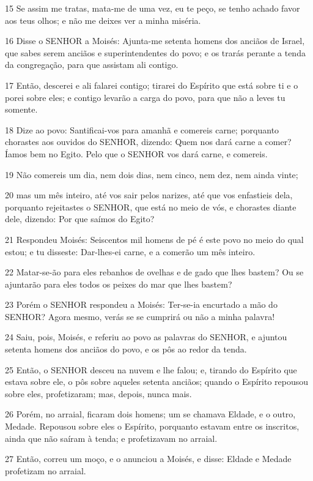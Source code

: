 \par 15 Se assim me tratas, mata-me de uma vez, eu te peço, se tenho achado favor aos teus olhos; e não me deixes ver a minha miséria.
\par 16 Disse o SENHOR a Moisés: Ajunta-me setenta homens dos anciãos de Israel, que sabes serem anciãos e superintendentes do povo; e os trarás perante a tenda da congregação, para que assistam ali contigo.
\par 17 Então, descerei e ali falarei contigo; tirarei do Espírito que está sobre ti e o porei sobre eles; e contigo levarão a carga do povo, para que não a leves tu somente.
\par 18 Dize ao povo: Santificai-vos para amanhã e comereis carne; porquanto chorastes aos ouvidos do SENHOR, dizendo: Quem nos dará carne a comer? Íamos bem no Egito. Pelo que o SENHOR vos dará carne, e comereis.
\par 19 Não comereis um dia, nem dois dias, nem cinco, nem dez, nem ainda vinte;
\par 20 mas um mês inteiro, até vos sair pelos narizes, até que vos enfastieis dela, porquanto rejeitastes o SENHOR, que está no meio de vós, e chorastes diante dele, dizendo: Por que saímos do Egito?
\par 21 Respondeu Moisés: Seiscentos mil homens de pé é este povo no meio do qual estou; e tu disseste: Dar-lhes-ei carne, e a comerão um mês inteiro.
\par 22 Matar-se-ão para eles rebanhos de ovelhas e de gado que lhes bastem? Ou se ajuntarão para eles todos os peixes do mar que lhes bastem?
\par 23 Porém o SENHOR respondeu a Moisés: Ter-se-ia encurtado a mão do SENHOR? Agora mesmo, verás se se cumprirá ou não a minha palavra!
\par 24 Saiu, pois, Moisés, e referiu ao povo as palavras do SENHOR, e ajuntou setenta homens dos anciãos do povo, e os pôs ao redor da tenda.
\par 25 Então, o SENHOR desceu na nuvem e lhe falou; e, tirando do Espírito que estava sobre ele, o pôs sobre aqueles setenta anciãos; quando o Espírito repousou sobre eles, profetizaram; mas, depois, nunca mais.
\par 26 Porém, no arraial, ficaram dois homens; um se chamava Eldade, e o outro, Medade. Repousou sobre eles o Espírito, porquanto estavam entre os inscritos, ainda que não saíram à tenda; e profetizavam no arraial.
\par 27 Então, correu um moço, e o anunciou a Moisés, e disse: Eldade e Medade profetizam no arraial.
